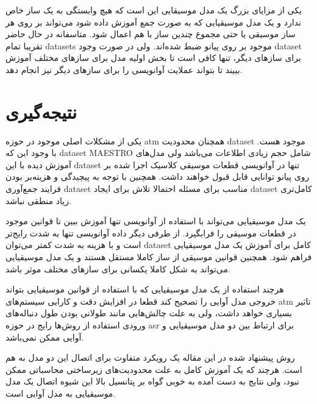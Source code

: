 یکی از مزایای بزرگ یک مدل موسیقایی این است که هیچ وابستگی به یک ساز خاص ندارد و
یک مدل موسیقیایی که به صورت جمع آموزش داده شود می‌تواند بر روی هر ساز موسیقی یا
حتی مجموع چندین ساز با هم اعمال شود. متاسفانه در حال حاضر تقریبا تمام
\glspl{dataset} موجود بر روی پیانو ضبط شده‌اند. ولی در صورت وجود \gls{dataset}
برای سازهای دیگر، تنها کافی است تا بخش اولیه مدل برای سازهای مختلف آموزش ببیند
تا بتواند عملایت آوانویسی را برای سازهای دیگر نیز انجام دهد.

\section{نتیجه‌گیری}
یکی از مشکلات اصلی موجود در حوزه \gls{atm} همچنان محدودیت \gls{dataset} موجود
هست. با وجود این که \gls{dataset} MAESTRO شامل حجم زیادی اطلاعات می‌باشد ولی
مدل‌های آموزش دیده با این \gls{dataset} تنها در آوانویسی قطعات موسیقی کلاسیک
اجرا شده بر روی پیانو توانایی قابل قبول خواهند داشت. همچنین با توجه به پیچیدگی و
هزینه‌بر بودن فرایند جمع‌آوری \gls{dataset} مناسب برای مسئله احتمالا تلاش برای
ایجاد \gls{dataset} کامل‌تری زیاد منطقی نباشد.

یک مدل موسیقیایی می‌تواند با استفاده از آوانویسی تنها آموزش ببین تا قوانین موجود
در قطعات موسیقی را فرابگیرد. از طرفی دیگر داده آوانویسی تنها به شدت رایج‌تر است
و با هزینه‌ به شدت کمتر می‌توان \gls{dataset} کامل برای آموزش یک مدل موسیقیایی
فراهم شود. همچنین قوانین موسیقی از ساز کاملا مستقل هستند و یک مدل موسیقیایی
می‌تواند به شکل کاملا یکسانی برای سازهای مختلف موثر باشد.

هرچند استفاده از یک مدل موسیقیایی که با استفاده از قوانین موسیقیایی بتواند خروجی
مدل آوایی را تصحیح کند قطعا در افزایش دقت و کارایی سیستم‌های \gls{atm} تاثیر
بسیاری خواهد داشت، ولی به علت چالش‌هایی مانند طولانی بودن طول دنباله‌های ورودی
استفاده از روش‌ها رایج در حوزه \gls{asr} برای ارتباط بین دو مدل موسیقیایی و
آوایی ممکن نمی‌باشد.

روش پیشنهاد شده در این مقاله یک رویکرد متفاوت برای اتصال این دو مدل به هم است.
هرچند که یک آموزش کامل به علت محدودیت‌های زیرساختی محاسباتی ممکن نبود، ولی نتایج
به دست آمده به خوبی گواه بر پتانسیل بالا این شیوه اتصال یک مدل موسیقیایی به مدل
آوایی است.
